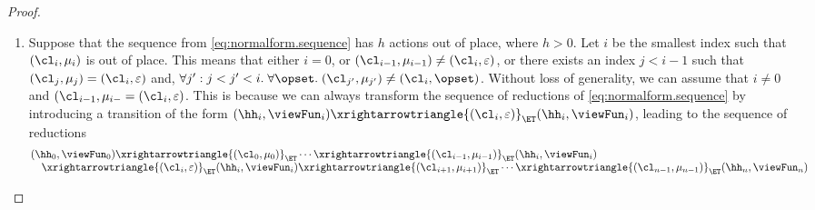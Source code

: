 \begin{proof}
\begin{enumerate}
\item Suppose that the sequence from \cref{eq:normalform.sequence} has $h$ actions out of place, 
where $h > 0$. Let $i$ be the smallest index such that $(\cl_{i}, \mu_{i})$ is out of place. 
This means that either $i = 0$, or $(\cl_{i-1}, \mu_{i-1}) \neq (\cl_{i}, \varepsilon)$, 
or there exists an index $j < i -1 $ such that $(\cl_{j}, \mu_{j}) = (\cl_{i}, \varepsilon)$ 
and, $\forall j': j < j' < i.\;\forall \opset.\;(\cl_{j'}, \mu_{j'}) \neq (\cl_{i}, \opset)$. 
Without loss of generality, we can assume that $i \neq 0$ and $(\cl_{i-1}, \mu_{i-} = (\cl_{i}, \varepsilon)$. 
This is because we can always transform the sequence of reductions of \cref{eq:normalform.sequence} by 
introducing a transition of the form $(\hh_{i}, \viewFun_{i}) \xrightarrowtriangle{(\cl_{i}, \varepsilon)}_{\ET}
(\hh_{i}, \viewFun_{i})$, leading to the sequence of reductions
\[
\begin{array}{@{}l@{}}
(\hh_{0}, \viewFun_{0}) \xrightarrowtriangle{(\cl_{0}, \mu_{0})}_{\ET} \cdots \xrightarrowtriangle{(\cl_{i-1}, \mu_{i-1})}_{\ET}
(\hh_{i}, \viewFun_{i}) \\
\quad \xrightarrowtriangle{(\cl_{i}, \varepsilon)}_{\ET} (\hh_{i}, \viewFun_{i}) \xrightarrowtriangle{(\cl_{i+1}, \mu_{i+1})}_{\ET} 
\cdots \xrightarrowtriangle{(\cl_{n-1}, \mu_{n-1})}_{\ET} (\hh_{n}, \viewFun_{n})
\end{array}
\]


\end{enumerate}
\end{proof}
